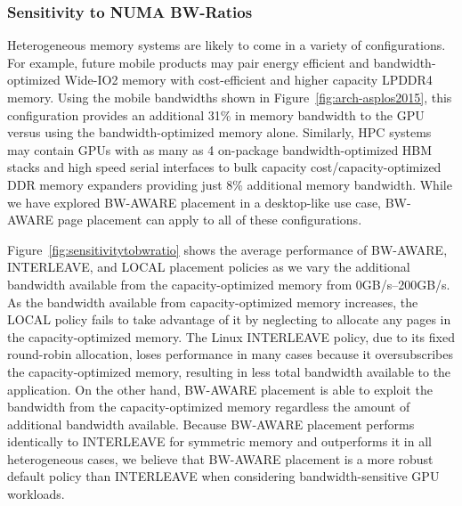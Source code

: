 \subsubsection{Sensitivity to NUMA BW-Ratios} 
Heterogeneous memory systems are likely to come in a variety of configurations.
For example, future mobile products may pair energy efficient and
bandwidth-optimized Wide-IO2 memory with cost-efficient and higher capacity
LPDDR4 memory.  Using the mobile bandwidths shown in
Figure~\ref{fig:arch-asplos2015}, this configuration provides an additional 31\%
in memory bandwidth to the GPU versus using the bandwidth-optimized memory
alone.  Similarly, HPC systems may contain GPUs with as many as 4 on-package
bandwidth-optimized HBM stacks and high speed serial interfaces to bulk capacity
cost/capacity-optimized DDR memory expanders providing just 8\% additional
memory bandwidth.  While we have explored BW-AWARE placement in a desktop-like
use case, BW-AWARE page placement can apply to all of these configurations.  

Figure~\ref{fig:sensitivitytobwratio} shows the average performance of BW-AWARE, INTERLEAVE, and LOCAL
placement policies as we vary the additional bandwidth available from the
capacity-optimized
memory from 0GB/s--200GB/s.
As the bandwidth available from capacity-optimized memory increases, the LOCAL policy
fails to take advantage of it by neglecting to allocate any pages in the capacity-optimized memory.
The Linux INTERLEAVE policy, due to its fixed round-robin allocation, loses performance
in many cases because it oversubscribes the capacity-optimized memory, resulting in less
total bandwidth available to the application.  On the other hand, BW-AWARE placement
is able to exploit the bandwidth from the capacity-optimized memory regardless the 
amount of additional bandwidth available.  Because BW-AWARE placement performs identically to
INTERLEAVE for symmetric memory and outperforms it in all heterogeneous cases, we believe that
BW-AWARE placement is a more robust default policy than INTERLEAVE when considering bandwidth-sensitive 
GPU workloads.
